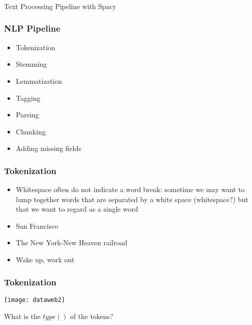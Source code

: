
\begin{frame}[fragile]\frametitle{}

\begin{center}
{\Large Text Processing Pipeline with Spacy}
\end{center}
\end{frame}

\begin{frame}[fragile]\frametitle{NLP Pipeline}

\begin{itemize}
\item Tokenization
\item Stemming
\item Lemmatization
\item Tagging
\item Parsing 
\item Chunking 
\item Adding missing fields 
\end{itemize}
\end{frame}

\begin{frame}[fragile]
\frametitle{Tokenization}
\begin{itemize}
\item Whitespace often do not indicate a word break: sometime we may want to lump together words that are separated by a white space  (whitespace?) but that we want to regard as a single word
\item San Francisco
\item The New York-New Heaven railroad
\item Wake up, work out
\end{itemize}
\end{frame}

\begin{frame}[fragile]
\frametitle{Tokenization}
\begin{center}
\texttt{[image: dataweb2]}
\end{center}
What is the $type()$ of the tokens?
\end{frame}


